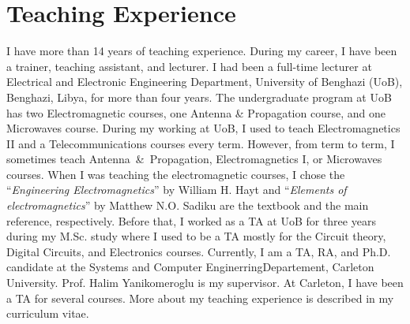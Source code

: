 \documentclass[11pt]{article}
\begin{document}
\section{Teaching Experience}
I have more than 14 years of teaching experience. During my career, I have been a trainer, teaching assistant, and lecturer. I had been a full-time lecturer at Electrical and Electronic Engineering Department, University of Benghazi (UoB), Benghazi, Libya, for more than four years. The undergraduate program at UoB has two Electromagnetic courses, one Antenna \& Propagation course, and one Microwaves course. During my working at UoB, I used to teach Electromagnetics II and a Telecommunications courses every term. However, from term to term, I sometimes teach Antenna~\&~Propagation, Electromagnetics I, or Microwaves courses. When I was teaching the electromagnetic courses, I chose the ``\emph{Engineering Electromagnetics}'' by William H. Hayt and ``\emph{Elements of electromagnetics}'' by Matthew N.O. Sadiku are the textbook and the main reference, respectively. Before that, I worked as a TA at UoB for three years during my M.Sc. study where I used to be a TA mostly for the  Circuit theory, Digital Circuits, and Electronics courses. Currently, I am a TA, RA, and Ph.D. candidate at the Systems and Computer EnginerringDepartement, Carleton University. Prof. Halim Yanikomeroglu is my supervisor. At Carleton, I have been a TA for several courses. More about my teaching experience is described in my curriculum vitae.
   
\end{document}
